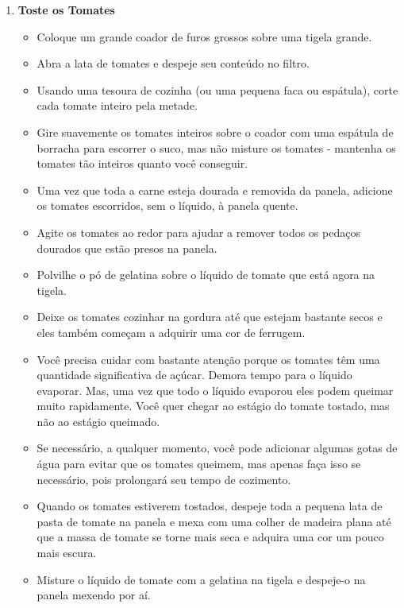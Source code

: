 \documentclass [11pt, letterpaper] {article}
\begin{document}
\begin {description}
\begin {enumerate}
\item {\bf Toste os Tomates}
\begin {itemize}
        \item Coloque um grande coador de furos grossos sobre uma tigela grande.
\item Abra a lata de tomates e despeje seu conteúdo no filtro.
\item Usando uma tesoura de cozinha (ou uma pequena faca ou espátula), corte cada tomate inteiro pela metade.
\item Gire suavemente os tomates inteiros sobre o coador com uma espátula de borracha para escorrer o suco, mas não misture os tomates - mantenha os tomates tão inteiros quanto você conseguir.
\item Uma vez que toda a carne esteja dourada e removida da panela, adicione os tomates escorridos, sem o líquido, à panela quente.
\item Agite os tomates ao redor para ajudar a remover todos os pedaços dourados que estão presos na panela.
\item Polvilhe o pó de gelatina sobre o líquido de tomate que está agora na tigela.
\item Deixe os tomates cozinhar na gordura até que estejam bastante secos e eles também começam a adquirir uma cor de ferrugem.
\item Você precisa cuidar com bastante atenção porque os tomates têm uma quantidade significativa de açúcar. Demora tempo para o líquido evaporar. Mas, uma vez que todo o líquido evaporou eles podem queimar muito rapidamente. Você quer chegar ao estágio do tomate tostado, mas não ao estágio queimado.
\item Se necessário, a qualquer momento, você pode adicionar algumas gotas de água para evitar que os tomates queimem, mas apenas faça isso se necessário, pois prolongará seu tempo de cozimento.
\item Quando os tomates estiverem tostados, despeje toda a pequena lata de pasta de tomate na panela e mexa com uma colher de madeira plana até que a massa de tomate se torne mais seca e adquira uma cor um pouco mais escura.
\item Misture o líquido de tomate com a gelatina na tigela e despeje-o na panela mexendo por aí.
\end {itemize}


\end{enumerate}
\end{description}
\end{document}
